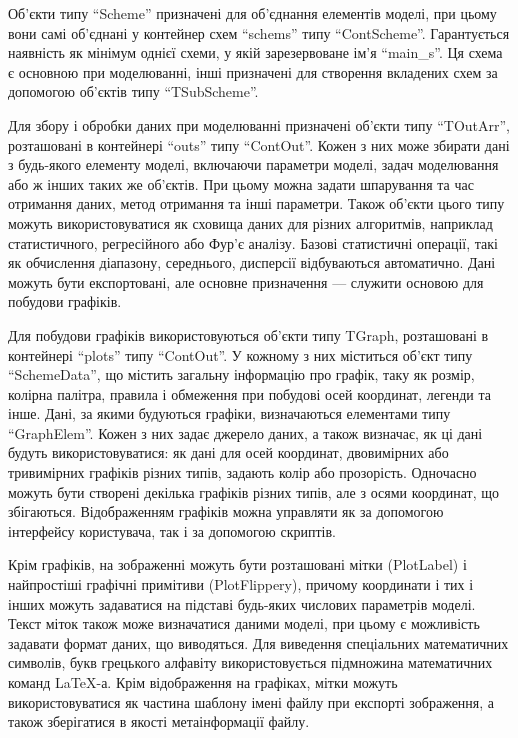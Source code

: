 Об'єкти типу ``Scheme'' призначені для об'єднання елементів моделі,
при цьому вони самі об'єднані у контейнер схем ``schems'' типу ``ContScheme''.
Гарантується наявність як мінімум однієї схеми, у якій
зарезервоване ім'я ``main\_s''. Ця схема є основною при моделюванні,
інші призначені для створення вкладених схем за допомогою
об'єктів типу ``TSubScheme''.

Для збору і обробки даних при моделюванні призначені об'єкти
типу ``TOutArr'', розташовані в контейнері ``outs'' типу ``ContOut''. Кожен з
них може збирати дані з будь-якого елементу моделі, включаючи
параметри моделі, задач моделювання або ж інших таких
же об'єктів. При цьому можна задати шпарування та час отримання
даних, метод отримання та інші параметри. Також об'єкти цього
типу можуть використовуватися як сховища даних для різних
алгоритмів, наприклад статистичного, регресійного або Фур'є
аналізу. Базові статистичні операції, такі як обчислення
діапазону, середнього, дисперсії відбуваються автоматично. Дані
можуть бути експортовані, але основне призначення --- служити
основою для побудови графіків.

Для побудови графіків використовуються об'єкти типу TGraph,
розташовані в контейнері ``plots'' типу ``ContOut''. У кожному з них
міститься об'єкт типу ``SchemeData'', що містить загальну інформацію
про графік, таку як розмір, колірна палітра, правила і обмеження
при побудові осей координат, легенди та інше. Дані, за якими
будуються графіки, визначаються елементами типу ``GraphElem''. Кожен
з них задає джерело даних, а також визначає, як ці дані будуть
використовуватися: як дані для осей координат, двовимірних
або тривимірних графіків різних типів, задають колір або
прозорість. Одночасно можуть бути створені декілька графіків
різних типів, але з осями координат, що збігаються. Відображенням
графіків можна управляти як за допомогою інтерфейсу
користувача, так і за допомогою скриптів.

Крім графіків, на зображенні можуть бути розташовані мітки
(PlotLabel) і найпростіші графічні примітиви (PlotFlippery), причому
координати і тих і інших можуть задаватися на підставі будь-яких
числових параметрів моделі. Текст міток також може визначатися
даними моделі, при цьому є можливість задавати формат даних, що
виводяться. Для виведення спеціальних математичних символів,
букв грецького алфавіту використовується підмножина
математичних команд \LaTeX-а. Крім відображення на графіках,
мітки можуть використовуватися як частина шаблону імені файлу
при експорті зображення, а також зберігатися в якості
метаінформації файлу.

